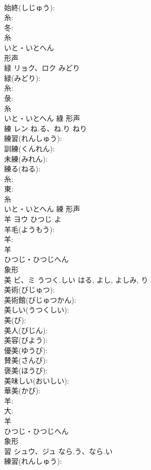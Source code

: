 \documentclass[8pt]{extreport}
\begin{document}
\begin{CJK}{UTF8}{min}
\\	始終(しじゅう): 
\\	糸: 
\\	冬: 
\\	糸	
\\	いと・いとへん	
\\	形声 
\\	緑	リョク、ロク	みどり		
\\	緑(みどり): 
\\	糸: 
\\	彔: 
\\	糸	
\\	いと・いとへん	綠	形声 
\\	練	レン	ね.る、ね.り	ねり	
\\	練習(れんしゅう): 
\\	訓練(くんれん): 
\\	未練(みれん): 
\\	練る(ねる): 
\\	糸: 
\\	東: 
\\	糸	
\\	いと・いとへん	練	形声 
\\	羊	ヨウ	ひつじ	よ	
\\	羊毛(ようもう): 
\\	羊: 
\\	羊	
\\	ひつじ・ひつじへん	
\\	象形 
\\	美	ビ、ミ	うつく.しい	はる, よし, よしみ, り	
\\	美術(びじゅつ): 
\\	美術館(びじゅつかん): 
\\	美しい(うつくしい): 
\\	美(び): 
\\	美人(びじん): 
\\	美容(びよう): 
\\	優美(ゆうび): 
\\	賛美(さんび): 
\\	褒美(ほうび): 
\\	美味しい(おいしい): 
\\	華美(かび): 
\\	羊: 
\\	大: 
\\	羊	
\\	ひつじ・ひつじへん	
\\	象形 
\\	習	シュウ、ジュ	なら.う、なら.い		
\\	練習(れんしゅう): 

\end{CJK}
\end{document}
